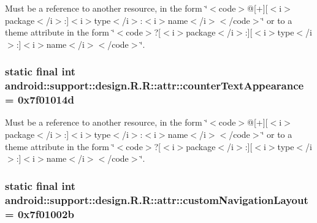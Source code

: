 Must be a reference to another resource, in the form \char`\"{}$<$code$>$@\mbox{[}+\mbox{]}\mbox{[}$<$i$>$package$<$/i$>$:\mbox{]}$<$i$>$type$<$/i$>$:$<$i$>$name$<$/i$>$$<$/code$>$\char`\"{} or to a theme attribute in the form \char`\"{}$<$code$>$?\mbox{[}$<$i$>$package$<$/i$>$:\mbox{]}\mbox{[}$<$i$>$type$<$/i$>$:\mbox{]}$<$i$>$name$<$/i$>$$<$/code$>$\char`\"{}. \hypertarget{classandroid_1_1support_1_1design_1_1_r_1_1attr_501a5adf3e53674839b8217d1ebb5456}{
\subsubsection[{counterTextAppearance}]{\setlength{\rightskip}{0pt plus 5cm}static final int android::support::design.R.R::attr::counterTextAppearance = 0x7f01014d}}
\label{classandroid_1_1support_1_1design_1_1_r_1_1attr_501a5adf3e53674839b8217d1ebb5456}


Must be a reference to another resource, in the form \char`\"{}$<$code$>$@\mbox{[}+\mbox{]}\mbox{[}$<$i$>$package$<$/i$>$:\mbox{]}$<$i$>$type$<$/i$>$:$<$i$>$name$<$/i$>$$<$/code$>$\char`\"{} or to a theme attribute in the form \char`\"{}$<$code$>$?\mbox{[}$<$i$>$package$<$/i$>$:\mbox{]}\mbox{[}$<$i$>$type$<$/i$>$:\mbox{]}$<$i$>$name$<$/i$>$$<$/code$>$\char`\"{}. \hypertarget{classandroid_1_1support_1_1design_1_1_r_1_1attr_2c5969b7007cf5002f37336eeaaf5a0f}{
\subsubsection[{customNavigationLayout}]{\setlength{\rightskip}{0pt plus 5cm}static final int android::support::design.R.R::attr::customNavigationLayout = 0x7f01002b}}
\label{classandroid_1_1support_1_1design_1_1_r_1_1attr_2c5969b7007cf5002f37336eeaaf5a0f}


